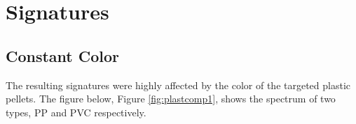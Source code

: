 \vspace{1.3cm}
\section{Signatures}

\subsection{Constant Color}
The resulting signatures were highly affected by the color of the targeted plastic pellets. The figure below, Figure \ref{fig:plastcomp1}, shows the spectrum of two types, PP and PVC respectively. 

\begin{figure}[H]
  \newcommand*\FigVSkip{0.5em}
  \newcommand*\FigHSkip{0.1em}
  \newsavebox\FigBox
  \centering
  \begin{minipage}{\wd\FigBox}
    \centering\usebox{\FigBox}
  \end{minipage}

\end{figure}
